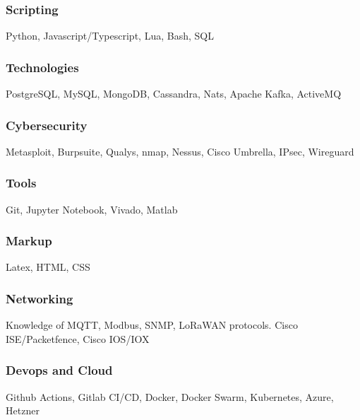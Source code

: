 \documentclass[11pt,a4paper]{article}
\begin{document}
  \subsubsection{Scripting}
  Python, Javascript/Typescript, Lua, Bash, SQL

  \subsubsection{Technologies}
  PostgreSQL, MySQL, MongoDB, Cassandra, Nats, Apache Kafka, ActiveMQ
  
  \subsubsection{Cybersecurity}
  Metasploit, Burpsuite, Qualys, nmap, Nessus, Cisco Umbrella, IPsec, Wireguard

  \subsubsection{Tools}
  Git, Jupyter Notebook, Vivado, Matlab 

  \subsubsection{Markup}
  Latex, HTML, CSS

  \subsubsection{Networking}
  Knowledge of MQTT, Modbus, SNMP, LoRaWAN protocols. Cisco ISE/Packetfence, Cisco IOS/IOX

  \subsubsection{Devops and Cloud}
  Github Actions, Gitlab CI/CD, Docker, Docker Swarm, Kubernetes, Azure, Hetzner

\end{document}
